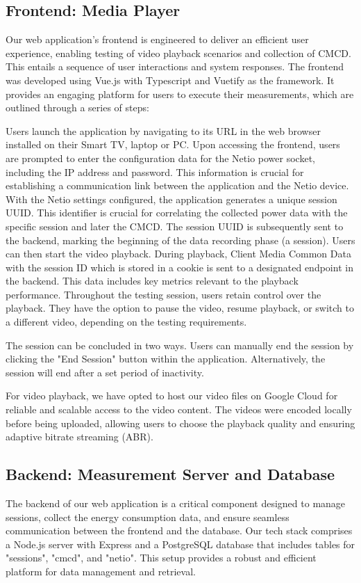 \subsection{Frontend: Media Player }
Our web application's frontend is engineered to deliver an efficient user experience, enabling testing of video playback scenarios and collection of CMCD. 
This entails a sequence of user interactions and system responses. 
The frontend was developed using Vue.js with Typescript and Vuetify as the framework. It provides an engaging platform for users to execute their measurements, which are outlined through a series of steps:

Users launch the application by navigating to its URL in the web browser installed on their Smart TV, laptop or PC. 
Upon accessing the frontend, users are prompted to enter the configuration data for the Netio power socket, including the IP address and password. 
This information is crucial for establishing a communication link between the application and the Netio device. 
With the Netio settings configured, the application generates a unique session UUID. 
This identifier is crucial for correlating the collected power data with the specific session and later the CMCD. 
The session UUID is subsequently sent to the backend, marking the beginning of the data recording phase (a session). 
Users can then start the video playback. 
During playback, Client Media Common Data with the session ID which is stored in a cookie is sent to a designated endpoint in the backend. 
This data includes key metrics relevant to the playback performance. Throughout the testing session, users retain control over the playback. They have the option to pause the video, resume playback, or switch to a different video, depending on the testing requirements.

The session can be concluded in two ways. Users can manually end the session by clicking the "End Session" button within the application. 
Alternatively, the session will end after a set period of inactivity.

For video playback, we have opted to host our video files on Google Cloud for reliable and scalable access to the video content. The videos were encoded locally before being uploaded, allowing users to choose the playback quality and ensuring adaptive bitrate streaming (ABR).

\subsection{Backend: Measurement Server and Database}
The backend of our web application is a critical component designed to manage sessions, collect the energy consumption data, and ensure seamless communication between the frontend and the database. 
Our tech stack comprises a Node.js server with Express and a PostgreSQL database that includes tables for "sessions", "cmcd", and "netio". This setup provides a robust and efficient platform for data management and retrieval.

